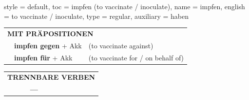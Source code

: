 \begin{verbentry}{
  style = {default},
  toc = {impfen (to vaccinate / inoculate)},
  name = {impfen},
  english = {to vaccinate / inoculate},
  type = {regular},
  auxiliary = {haben}
}
\vspace{10pt}

\begin{tabular}{lll}
\multicolumn{3}{l}{\textbf{MIT PRÄPOSITIONEN}}\\
& \textbf{impfen gegen} + Akk & (to vaccinate against)\\
& \textbf{impfen für} + Akk & (to vaccinate for / on behalf of)\\
\end{tabular}
\hfill
\begin{tabular}{lll}
\multicolumn{3}{l}{\textbf{TRENNBARE VERBEN}}\\
& \textbf{---} & \\
\end{tabular}
\vspace{-5pt}
\end{verbentry}

